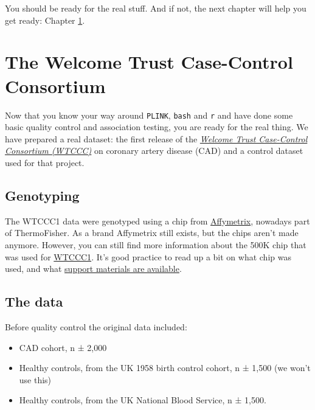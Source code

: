 \documentclass[
]{book}
\providecommand{\tightlist}{%
  \setlength{\itemsep}{0pt}\setlength{\parskip}{0pt}}
\begin{document}
You should be ready for the real stuff. And if not, the next chapter will help you get ready: Chapter \ref{wtccc1-intro}.

\hypertarget{wtccc1-intro}{%
\chapter{The Welcome Trust Case-Control Consortium}\label{wtccc1-intro}}

Now that you know your way around \texttt{PLINK}, \texttt{bash} and \texttt{r} and have done some basic quality control and association testing, you are ready for the real thing. We have prepared a real dataset: the first release of the \href{https://www.wtccc.org.uk/ccc1/overview.html}{\emph{Welcome Trust Case-Control Consortium (WTCCC)}} on coronary artery disease (CAD) and a control dataset used for that project.

\hypertarget{genotyping}{%
\section{Genotyping}\label{genotyping}}

The WTCCC1 data were genotyped using a chip from \href{https://www.thermofisher.com/us/en/home/life-science/microarray-analysis/affymetrix.html?category=34000\&categoryIdClicked=34000\&rootCategoryId=34000\&navMode=34000\&aId=productsNav}{Affymetrix}, nowadays part of ThermoFisher. As a brand Affymetrix still exists, but the chips aren't made anymore. However, you can still find more information about the 500K chip that was used for \href{http://www.affymetrix.com/support/technical/datasheets/500k_datasheet.pdf}{WTCCC1}. It's good practice to read up a bit on what chip was used, and what \href{http://www.affymetrix.com/support/technical/byproduct.affx?product=500k}{support materials are available}.

\hypertarget{the-data}{%
\section{The data}\label{the-data}}

Before quality control the original data included:

\begin{itemize}
\tightlist
\item
  CAD cohort, n ± 2,000
\item
  Healthy controls, from the UK 1958 birth control cohort, n ± 1,500 (we won't use this)
\item
  Healthy controls, from the UK National Blood Service, n ± 1,500.
\end{itemize}
\end{document}
